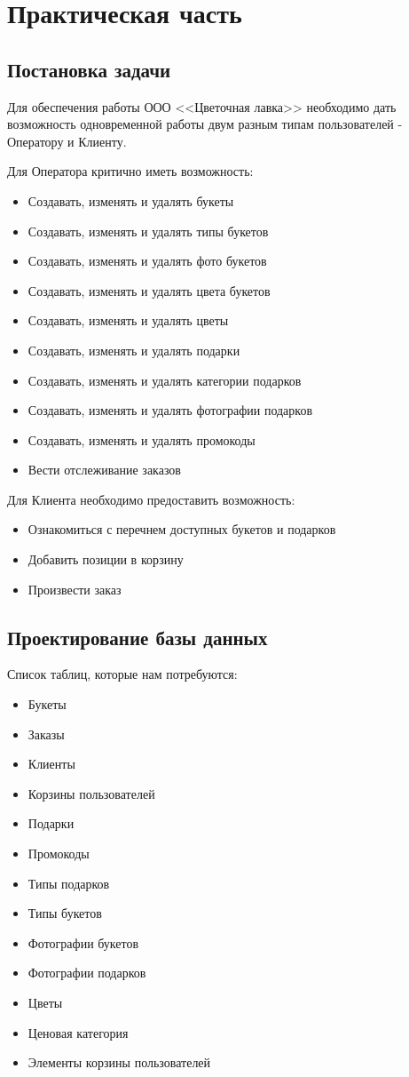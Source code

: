 \section{Практическая часть}
\subsection{Постановка задачи}

Для обеспечения работы ООО <<Цветочная лавка>> необходимо дать возможность одновременной работы двум разным типам пользователей - Оператору и Клиенту.

Для Оператора критично иметь возможность:
\begin{itemize}
	\item Создавать, изменять и удалять букеты
	\item Создавать, изменять и удалять типы букетов
	\item Создавать, изменять и удалять фото букетов
	\item Создавать, изменять и удалять цвета букетов
	\item Создавать, изменять и удалять цветы
	\item Создавать, изменять и удалять подарки
	\item Создавать, изменять и удалять категории подарков
	\item Создавать, изменять и удалять фотографии подарков
	\item Создавать, изменять и удалять промокоды
	\item Вести отслеживание заказов
\end{itemize}

Для Клиента необходимо предоставить возможность:
\begin{itemize}
	\item Ознакомиться с перечнем доступных букетов и подарков
	\item Добавить позиции в корзину
	\item Произвести заказ 
\end{itemize}

\subsection{Проектирование базы данных}

Список таблиц, которые нам потребуются:

\begin{itemize}
	\item Букеты
	\item Заказы
	\item Клиенты
	\item Корзины пользователей
	\item Подарки
	\item Промокоды
	\item Типы подарков
	\item Типы букетов
	\item Фотографии букетов
	\item Фотографии подарков
	\item Цветы
	\item Ценовая категория
	\item Элементы корзины пользователей	
\end{itemize}

